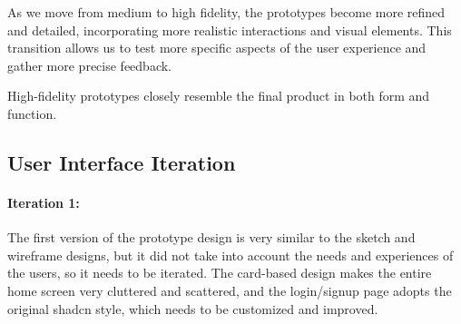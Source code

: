 As we move from medium to high fidelity, the prototypes become more refined and detailed, incorporating more realistic interactions and visual elements. This transition allows us to test more specific aspects of the user experience and gather more precise feedback.

High-fidelity prototypes closely resemble the final product in both form and function.


\subsection{User Interface Iteration}
\paragraph{Iteration 1:}

The first version of the prototype design is very similar to the sketch and wireframe designs, but it did not take into account the needs and experiences of the users, so it needs to be iterated. The card-based design makes the entire home screen very cluttered and scattered, and the login/signup page adopts the original shadcn style, which needs to be customized and improved.
